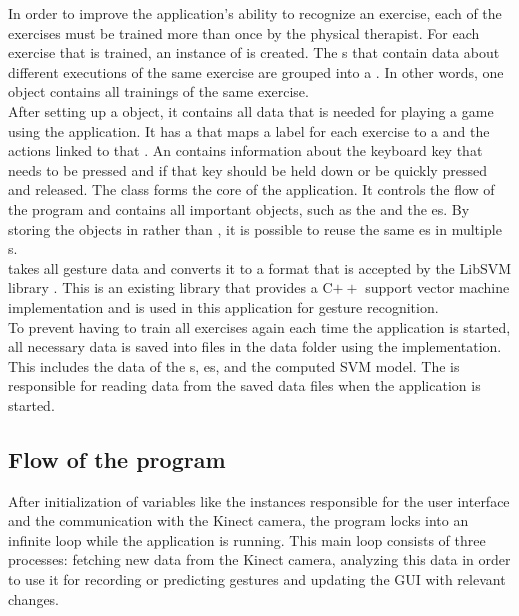 In order to improve the application's ability to recognize an exercise, each of the exercises must be trained more than once by the physical therapist. For each exercise that is trained, an instance of  is created. The s that contain data about different executions of the same exercise are grouped into a . In other words, one  object contains all trainings of the same exercise.\\

After setting up a  object, it contains all data that is needed for playing a game using the application. It has a  that maps a label for each exercise to a  and the actions linked to that . An  contains information about the keyboard key that needs to be pressed and if that key should be held down or be quickly pressed and released. The  class forms the core of the application. It controls the flow of the program and contains all important objects, such as the  and the es. By storing the  objects in  rather than , it is possible to reuse the same es in multiple s.\\

 takes all gesture data and converts it to a format that is accepted by the LibSVM library \cite{LibSVM}. This is an existing library that provides a C$++$ support vector machine implementation and is used in this application for gesture recognition.\\

To prevent having to train all exercises again each time the application is started, all necessary data is saved into files in the data folder using the  implementation. This includes the data of the s, es,  and the computed SVM model. The  is responsible for reading data from the saved data files when the application is started.\\


\subsection{Flow of the program}

After initialization of variables like the instances responsible for the user interface and the communication with the Kinect camera, the program locks into an infinite loop while the application is running. This main loop consists of three processes: fetching new data from the Kinect camera, analyzing this data in order to use it for recording or predicting gestures and updating the GUI with relevant changes.\\

